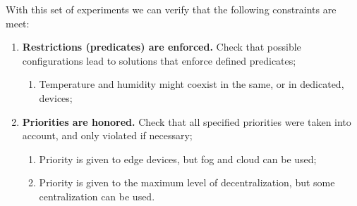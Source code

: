 With this set of experiments we can verify that the following constraints are meet:
\begin{enumerate}
    \item \textbf{Restrictions (predicates) are enforced.} Check that possible configurations lead to solutions that enforce defined predicates;
        \begin{enumerate}
            \item Temperature and humidity might coexist in the same, or in dedicated, devices;
        \end{enumerate}
    \item \textbf{Priorities are honored.} Check that all specified priorities were taken into account, and only violated if necessary;
        \begin{enumerate}
            \item Priority is given to edge devices, but fog and cloud can be used;
            \item Priority is given to the maximum level of decentralization, but some centralization can be used.
        \end{enumerate}
\end{enumerate}

